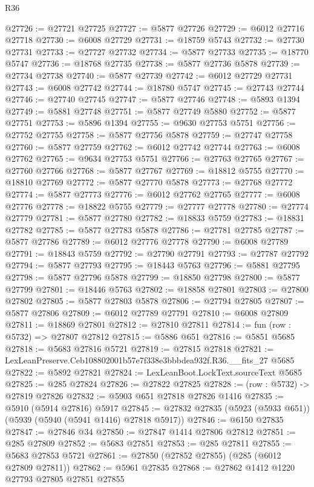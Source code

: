 \begin{lexlean}{R36}
\begin{coremodule}
@27726 := @27721 @27725
@27727 := @5877 @27726
@27729 := @6012 @27716 @27718
@27730 := @6008 @27729
@27731 := @18759 @5743
@27732 := @27730 @27731
@27733 := @27727 @27732
@27734 := @5877 @27733
@27735 := @18770 @5747
@27736 := @18768 @27735
@27738 := @5877 @27736 @5878
@27739 := @27734 @27738
@27740 := @5877 @27739
@27742 := @6012 @27729 @27731
@27743 := @6008 @27742
@27744 := @18780 @5747
@27745 := @27743 @27744
@27746 := @27740 @27745
@27747 := @5877 @27746
@27748 := @5893 @1394
@27749 := @5881 @27748
@27751 := @5877 @27749 @5880
@27752 := @5877 @27751
@27753 := @5896 @1394
@27755 := @9630 @27753 @5751
@27756 := @27752 @27755
@27758 := @5877 @27756 @5878
@27759 := @27747 @27758
@27760 := @5877 @27759
@27762 := @6012 @27742 @27744
@27763 := @6008 @27762
@27765 := @9634 @27753 @5751
@27766 := @27763 @27765
@27767 := @27760 @27766
@27768 := @5877 @27767
@27769 := @18812 @5755
@27770 := @18810 @27769
@27772 := @5877 @27770 @5878
@27773 := @27768 @27772
@27774 := @5877 @27773
@27776 := @6012 @27762 @27765
@27777 := @6008 @27776
@27778 := @18822 @5755
@27779 := @27777 @27778
@27780 := @27774 @27779
@27781 := @5877 @27780
@27782 := @18833 @5759
@27783 := @18831 @27782
@27785 := @5877 @27783 @5878
@27786 := @27781 @27785
@27787 := @5877 @27786
@27789 := @6012 @27776 @27778
@27790 := @6008 @27789
@27791 := @18843 @5759
@27792 := @27790 @27791
@27793 := @27787 @27792
@27794 := @5877 @27793
@27795 := @18443 @5763
@27796 := @5881 @27795
@27798 := @5877 @27796 @5878
@27799 := @18850 @27798
@27800 := @5877 @27799
@27801 := @18446 @5763
@27802 := @18858 @27801
@27803 := @27800 @27802
@27805 := @5877 @27803 @5878
@27806 := @27794 @27805
@27807 := @5877 @27806
@27809 := @6012 @27789 @27791
@27810 := @6008 @27809
@27811 := @18869 @27801
@27812 := @27810 @27811
@27814 := fun (row : @5732) => @27807 @27812
@27815 := @5886 @651
@27816 := @5851 @5685
@27818 := @5683 @27816 @5721
@27819 := @27815 @27818
@27821 := LexLeanPreserve.Ceb108802001b57e7f338e3bbbdea932f.R36.__fits_27 @5685
@27822 := @5892 @27821
@27824 := LexLeanBoot.LockText.sourceText @5685
@27825 := @285 @27824
@27826 := @27822 @27825
@27828 := (row : @5732) -> @27819 @27826
@27832 := @5903 @651 @27818 @27826 @1416
@27835 := @5910 (@5914 @27816) @5917
@27845 := @27832 @27835 (@5923 (@5933 @651)) (@5939 (@5940 (@5941 @1416) @27818 @5917))
@27846 := @6150 @27835
@27847 := @27846 @34
@27850 := @27847 @1414 @27806 @27812
@27851 := @285 @27809
@27852 := @5683 @27851
@27853 := @285 @27811
@27855 := @5683 @27853 @5721
@27861 := @27850 (@27852 @27855) (@285 (@6012 @27809 @27811))
@27862 := @5961 @27835
@27868 := @27862 @1412 @1220 @27793 @27805 @27851 @27855

\end{coremodule}
\end{lexlean}

